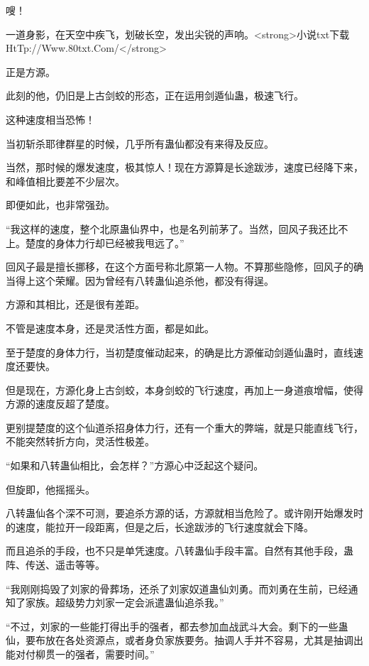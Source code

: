 
\begin{this_body}

嗖！

一道身影，在天空中疾飞，划破长空，发出尖锐的声响。<strong>小说txt下载HtTp://Www.80txt.Com/</strong>

正是方源。

此刻的他，仍旧是上古剑蛟的形态，正在运用剑遁仙蛊，极速飞行。

这种速度相当恐怖！

当初斩杀耶律群星的时候，几乎所有蛊仙都没有来得及反应。

当然，那时候的爆发速度，极其惊人！现在方源算是长途跋涉，速度已经降下来，和峰值相比要差不少层次。

即便如此，也非常强劲。

“我这样的速度，整个北原蛊仙界中，也是名列前茅了。当然，回风子我还比不上。楚度的身体力行却已经被我甩远了。”

回风子最是擅长挪移，在这个方面号称北原第一人物。不算那些隐修，回风子的确当得上这个荣耀。因为曾经有八转蛊仙追杀他，都没有得逞。

方源和其相比，还是很有差距。

不管是速度本身，还是灵活性方面，都是如此。

至于楚度的身体力行，当初楚度催动起来，的确是比方源催动剑遁仙蛊时，直线速度还要快。

但是现在，方源化身上古剑蛟，本身剑蛟的飞行速度，再加上一身道痕增幅，使得方源的速度反超了楚度。

更别提楚度的这个仙道杀招身体力行，还有一个重大的弊端，就是只能直线飞行，不能突然转折方向，灵活性极差。

“如果和八转蛊仙相比，会怎样？”方源心中泛起这个疑问。

但旋即，他摇摇头。

八转蛊仙各个深不可测，要追杀方源的话，方源就相当危险了。或许刚开始爆发时的速度，能拉开一段距离，但是之后，长途跋涉的飞行速度就会下降。

而且追杀的手段，也不只是单凭速度。八转蛊仙手段丰富。自然有其他手段，蛊阵、传送、遥击等等。

“我刚刚捣毁了刘家的骨葬场，还杀了刘家奴道蛊仙刘勇。而刘勇在生前，已经通知了家族。超级势力刘家一定会派遣蛊仙追杀我。”

“不过，刘家的一些能打得出手的强者，都去参加血战武斗大会。剩下的一些蛊仙，要布放在各处资源点，或者身负家族要务。抽调人手并不容易，尤其是抽调出能对付柳贯一的强者，需要时间。”


\end{this_body}
